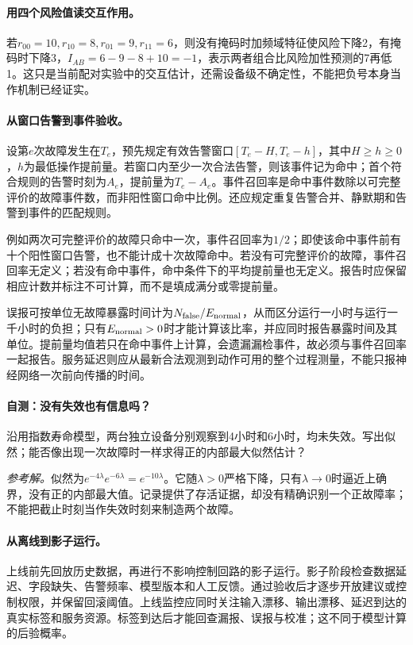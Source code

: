 \paragraph{用四个风险值读交互作用。}
若$r_{00}=10,r_{10}=8,r_{01}=9,r_{11}=6$，则没有掩码时加频域特征使风险下降2，有掩码时下降3，$I_{AB}=6-9-8+10=-1$，表示两者组合比风险加性预测的7再低1。这只是当前配对实验中的交互估计，还需设备级不确定性，不能把负号本身当作机制已经证实。

\paragraph{从窗口告警到事件验收。}
设第$e$次故障发生在$T_e$，预先规定有效告警窗口$[T_e-H,T_e-h]$，其中$H\geq h\geq0$，$h$为最低操作提前量。若窗口内至少一次合法告警，则该事件记为命中；首个符合规则的告警时刻为$A_e$，提前量为$T_e-A_e$。事件召回率是命中事件数除以可完整评价的故障事件数，而非阳性窗口命中比例。还应规定重复告警合并、静默期和告警到事件的匹配规则。

例如两次可完整评价的故障只命中一次，事件召回率为$1/2$；即使该命中事件前有十个阳性窗口告警，也不能计成十次故障命中。若没有可完整评价的故障，事件召回率无定义；若没有命中事件，命中条件下的平均提前量也无定义。报告时应保留相应计数并标注不可计算，而不是填成满分或零提前量。

误报可按单位无故障暴露时间计为$N_{\rm false}/E_{\rm normal}$，从而区分运行一小时与运行一千小时的负担；只有$E_{\rm normal}>0$时才能计算该比率，并应同时报告暴露时间及其单位。提前量均值若只在命中事件上计算，会遗漏漏检事件，故必须与事件召回率一起报告。服务延迟则应从最新合法观测到动作可用的整个过程测量，不能只报神经网络一次前向传播的时间。

\paragraph{自测：没有失效也有信息吗？}
沿用指数寿命模型，两台独立设备分别观察到4小时和6小时，均未失效。写出似然；能否像出现一次故障时一样求得正的内部最大似然估计？

\textit{参考解。}似然为$e^{-4\lambda}e^{-6\lambda}=e^{-10\lambda}$。它随$\lambda>0$严格下降，只有$\lambda\to0$时逼近上确界，没有正的内部最大值。记录提供了存活证据，却没有精确识别一个正故障率；不能把截止时刻当作失效时刻来制造两个故障。

\paragraph{从离线到影子运行。}
上线前先回放历史数据，再进行不影响控制回路的影子运行。影子阶段检查数据延迟、字段缺失、告警频率、模型版本和人工反馈。通过验收后才逐步开放建议或控制权限，并保留回滚阈值。上线监控应同时关注输入漂移、输出漂移、延迟到达的真实标签和服务资源。标签到达后才能回查漏报、误报与校准；这不同于模型计算的后验概率。


